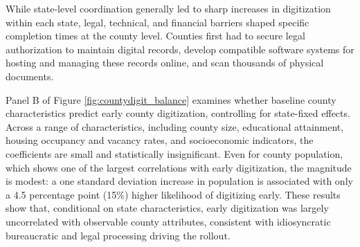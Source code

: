 \documentclass[11pt]{article}
\begin{document}
While state-level coordination generally led to sharp increases in digitization within each state, legal, technical, and financial barriers shaped specific completion times at the county level. Counties first had to secure legal authorization to maintain digital records, develop compatible software systems for hosting and managing these records online, and scan thousands of physical documents. 

Panel B of Figure \ref{fig:countydigit_balance} examines whether baseline county characteristics predict early county digitization, controlling for state-fixed effects. Across a range of characteristics, including county size, educational attainment, housing occupancy and vacancy rates, and socioeconomic indicators, the coefficients are small and statistically insignificant. Even for county population, which shows one of the largest correlations with early digitization, the magnitude is modest: a one standard deviation increase in population is associated with only a 4.5 percentage point (15\%) higher likelihood of digitizing early. %
These results show that, conditional on state characteristics, early digitization was largely uncorrelated with observable county attributes, consistent with idiosyncratic bureaucratic and legal processing driving the rollout. 





\end{document}
